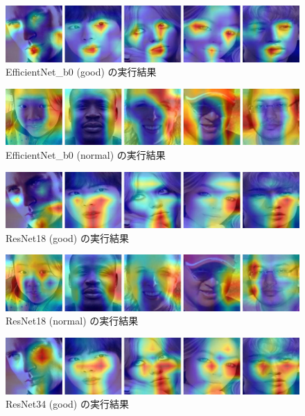 \documentclass[a4paper,11pt,titlepage]{jsarticle}
\begin{document}
\begin{figure}[H]
    \centering
    \includegraphics[width=1.1\textwidth]{efficientnetb0(good).jpg}
    \caption{EfficientNet\_b0 (good) の実行結果}
    \label{fig:append_efficientnetb0(good)}
\end{figure}

\begin{figure}[H]
    \centering
    \includegraphics[width=1.1\textwidth]{efficientnetb0(normal).jpg}
    \caption{EfficientNet\_b0 (normal) の実行結果}
    \label{fig:append_efficientnetb0(normal)}
\end{figure}

\begin{figure}[H]
    \centering
    \includegraphics[width=1.1\textwidth]{resent18(good).jpg}
    \caption{ResNet18 (good) の実行結果}
    \label{fig:append_resent18(good)}
\end{figure}

\begin{figure}[H]
    \centering
    \includegraphics[width=1.1\textwidth]{resnet18(normal).jpg}
    \caption{ResNet18 (normal) の実行結果}
    \label{fig:append_resnet18(normal)}
\end{figure}

\begin{figure}[H]
    \centering
    \includegraphics[width=1.1\textwidth]{resnet34(good).jpg}
    \caption{ResNet34 (good) の実行結果}
    \label{fig:append_resnet34(good)}
\end{figure}
\end{document}
